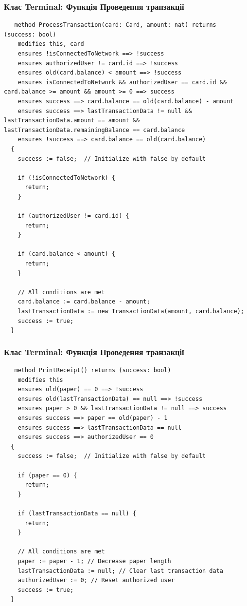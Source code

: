 \documentclass[12pt]{article}
\begin{document}
\subsubsection*{Клас Terminal: Функція Проведення транзакції}

\begin{lstlisting}
   method ProcessTransaction(card: Card, amount: nat) returns (success: bool)
    modifies this, card
    ensures !isConnectedToNetwork ==> !success
    ensures authorizedUser != card.id ==> !success
    ensures old(card.balance) < amount ==> !success
    ensures isConnectedToNetwork && authorizedUser == card.id && card.balance >= amount && amount >= 0 ==> success
    ensures success ==> card.balance == old(card.balance) - amount
    ensures success ==> lastTransactionData != null && lastTransactionData.amount == amount && lastTransactionData.remainingBalance == card.balance
    ensures !success ==> card.balance == old(card.balance)
  {
    success := false;  // Initialize with false by default

    if (!isConnectedToNetwork) {
      return;
    }

    if (authorizedUser != card.id) {
      return;
    }

    if (card.balance < amount) {
      return;
    }

    // All conditions are met
    card.balance := card.balance - amount;
    lastTransactionData := new TransactionData(amount, card.balance);
    success := true;
  }
\end{lstlisting}

\subsubsection*{Клас Terminal: Функція Проведення транзакції}

\begin{lstlisting}
   method PrintReceipt() returns (success: bool)
    modifies this
    ensures old(paper) == 0 ==> !success
    ensures old(lastTransactionData) == null ==> !success
    ensures paper > 0 && lastTransactionData != null ==> success
    ensures success ==> paper == old(paper) - 1
    ensures success ==> lastTransactionData == null
    ensures success ==> authorizedUser == 0
  {
    success := false;  // Initialize with false by default
    
    if (paper == 0) {
      return;
    }

    if (lastTransactionData == null) {
      return;
    }

    // All conditions are met
    paper := paper - 1; // Decrease paper length
    lastTransactionData := null; // Clear last transaction data
    authorizedUser := 0; // Reset authorized user
    success := true;
  }
\end{lstlisting}
\end{document}
